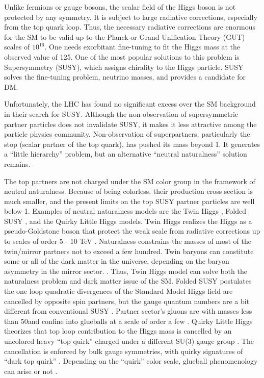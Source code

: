 Unlike fermions or gauge bosons, the scalar field of the Higgs boson is not protected by any symmetry. It is subject to large radiative corrections, especially from the top quark loop.
Thus, the necessary radiative corrections are enormous for the SM to be valid up to the Planck or Grand Unification Theory (GUT) scales of $10^{16}$\GeV.
One needs exorbitant fine-tuning to fit the Higgs mass at the observed value of 125\GeV.
One of the most popular solutions to this problem is Supersymmetry (SUSY), which assigns chirality to the Higgs particle.
SUSY solves the fine-tuning problem, neutrino masses, and provides a candidate for DM.

Unfortunately, the LHC has found no significant excess over the SM background in their search for SUSY\cite{SUSY}.
Although the non-observation of supersymmetric partner particles does not invalidate SUSY, it makes it less attractive among the particle physics community.
Non-observation of superpartners, particularly the stop (scalar partner of the top quark), has pushed its mass beyond 1\TeV.
It generates a ``little hierarchy'' problem, but an alternative ``neutral naturalness'' solution remains.

The top partners are not charged under the SM color group in the framework of neutral naturalness.
Because of being colorless, their production cross section is much smaller, and the present limits on the top SUSY partner particles are well below 1\TeV.
Examples of neutral naturalness models are the Twin Higgs \cite{Chacko:2005pe},
Folded SUSY \cite{Burdman:2006tz}, and the Quirky Little Higgs \cite{Cai:2008au} models.
Twin Higgs realizes the Higgs as a pseudo-Goldstone boson that protect the weak scale from radiative corrections up to scales of order 5 - 10 TeV \cite{Chacko:2005pe}.
Naturalness constrains the masses of most of the twin/mirror partners not to exceed a few hundred\GeV \cite{Chacko:2005pe}.
Twin baryons can constitute some or all of the dark matter in the universe, depending on the baryon asymmetry in the mirror sector. \cite{Chacko:2005pe}.
Thus, Twin Higgs model can solve both the naturalness problem and dark matter issue of the SM.
Folded SUSY postulates the one loop quadratic divergences of the Standard Model Higgs field are cancelled by opposite spin partners, but the gauge quantum numbers are a bit different from conventional SUSY \cite{Burdman:2006tz}.
Partner sector's gluons are with masses less than 50\GeV and confine into glueballs at a scale of order a few \GeV \cite{Burdman:2006tz}.
Quirky Little Higgs theorizes that top loop contribution to the Higgs mass is cancelled by an uncolored heavy ``top quirk'' charged under a different SU(3) gauge group \cite{Cai:2008au}. 
The cancellation is enforced by bulk gauge symmetries, with quirky signatures of ``dark top quirk'' \cite{Cai:2008au}.
Depending on the ``quirk'' color scale, glueball phenomenology can arise or not \cite{Cai:2008au}.


